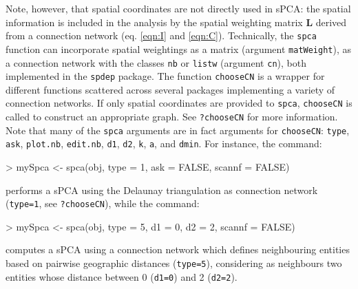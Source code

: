 \documentclass{article}
\newcommand{\m}[1]{\mathbf{#1}}
\begin{document}
Note, however, that spatial coordinates are not directly used in sPCA:
the spatial information is included in the analysis by the spatial
weighting matrix $\m{L}$ derived from a connection network (eq. \ref{eqn:I} and \ref{eqn:C}).
Technically, the \texttt{spca} function can incorporate spatial weightings as a matrix (argument
\texttt{matWeight}), as a connection network with the classes
\texttt{nb} or \texttt{listw} (argument \texttt{cn}), both implemented in the \texttt{spdep} package.
The function \texttt{chooseCN} is a wrapper for different functions
scattered across several packages implementing a variety of connection networks.
If only spatial coordinates are provided to \texttt{spca},
\texttt{chooseCN} is called to construct an appropriate graph.
See \texttt{?chooseCN} for more information.
Note that many of the \texttt{spca} arguments are in fact arguments
for \texttt{chooseCN}: \texttt{type}, \texttt{ask}, \texttt{plot.nb},
\texttt{edit.nb}, \texttt{d1}, \texttt{d2}, \texttt{k}, \texttt{a}, and \texttt{dmin}.
For instance, the command:
\begin{Schunk}
\begin{Sinput}
> mySpca <- spca(obj, type = 1, ask = FALSE, scannf = FALSE)
\end{Sinput}
\end{Schunk}
\noindent performs a sPCA using the Delaunay triangulation as
connection network (\texttt{type=1}, see \texttt{?chooseCN}), while
the command:
\begin{Schunk}
\begin{Sinput}
> mySpca <- spca(obj, type = 5, d1 = 0, d2 = 2, scannf = FALSE)
\end{Sinput}
\end{Schunk}
\noindent computes a sPCA using a connection network which defines
neighbouring entities based on pairwise geographic distances (\texttt{type=5}),
considering as neighbours two entities whose distance between 0 (\texttt{d1=0}) and 2 (\texttt{d2=2}).
\\
\end{document}
